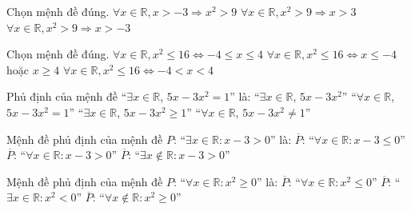 \begin{ex}%
	Chọn mệnh đề đúng. 
		{$\forall x\in\mathbb{R}, x>-3\Rightarrow x^2>9$} 
		{$\forall  x\in\mathbb{R}, x^2>9\Rightarrow x>3$}
		{$\forall x\in\mathbb{R}, x^2>9\Rightarrow  x>-3$}
\end{ex}

\begin{ex}%
	Chọn mệnh  đề đúng.
		{\True $\forall x\in\mathbb{R}, x^2\leq  16\Leftrightarrow -4\leq x\leq 4$}
		{$\forall x\in\mathbb{R}, x^2\leq 16\Leftrightarrow  x\leq -4$ hoặc $x\geq 4$}
		{$\forall x\in\mathbb{R}, x^2\leq 16\Leftrightarrow  -4<x<4$}
\end{ex}

\begin{ex}%
	Phủ định của mệnh đề ``$\exists x\in\mathbb{R}$, $5x-3x^2=1$'' là: 
	\choice 
		{``$\exists  x\in\mathbb{R}$, $5x-3x^2$''}
		{``$\forall x\in\mathbb{R}$, $5x-3x^2=1$''} 
		{``$\exists  x\in\mathbb{R}$, $5x-3x^2\geq 1$''}
		{\True ``$\forall x\in\mathbb{R}$, $5x-3x^2\ne  1$''}
\end{ex}

\begin{ex}%
	Mệnh đề phủ định của mệnh đề $P$: “$\exists x\in\mathbb{R}:x-3>0$”  là:
		{\True $\overline{P}$:  “$\forall x\in\mathbb{R}:x-3\leq 0$”}
		{$\overline{P}$: “$\forall  x\in\mathbb{R}:x-3>0$”}
		{$\overline{P}$:  “$\exists x\notin\mathbb{R}:x-3>0$”}
\end{ex}

\begin{ex}%
	Mệnh đề phủ  định của mệnh đề $P$: “$\forall x\in\mathbb{R}:x^2\geq 0$” là:
		 {$\overline{P}$: “$\forall x\in\mathbb{R}:x^2\leq 0$”}
		{\True  $\overline{P}$: “$\exists x\in\mathbb{R}:x^2<0$”}
		 {$\overline{P}$: “$\forall x\notin\mathbb{R}:x^2\geq 0$”}
\end{ex}


